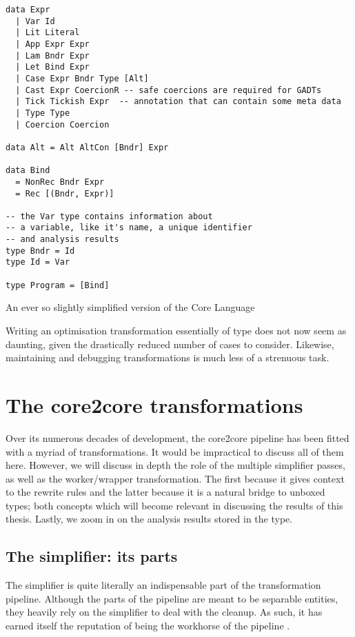 \begin{listing}[H]
\begin{verbatim}
data Expr
  | Var Id
  | Lit Literal
  | App Expr Expr
  | Lam Bndr Expr
  | Let Bind Expr
  | Case Expr Bndr Type [Alt]
  | Cast Expr CoercionR -- safe coercions are required for GADTs
  | Tick Tickish Expr  -- annotation that can contain some meta data
  | Type Type
  | Coercion Coercion
  
data Alt = Alt AltCon [Bndr] Expr
 
data Bind
  = NonRec Bndr Expr
  = Rec [(Bndr, Expr)]
  
-- the Var type contains information about
-- a variable, like it's name, a unique identifier
-- and analysis results
type Bndr = Id
type Id = Var

type Program = [Bind]
\end{verbatim}
\label{code:core_def}
\caption{An ever so slightly simplified version of the Core Language}
\end{listing}

Writing an optimisation transformation essentially of type  does not now seem
as daunting, given the drastically reduced number of cases to consider. 
Likewise, maintaining and debugging transformations is much less of a strenuous task.

\section{The core2core transformations}

Over its numerous decades of development, the core2core pipeline has been fitted with a myriad of transformations.
It would be impractical to discuss all of them here. However, we will discuss in depth the role of the multiple simplifier
passes, as well as the worker/wrapper transformation. The first because it gives context to the rewrite rules and the latter
because it is a natural bridge to unboxed types; both concepts which will become relevant in discussing the results of this thesis.
Lastly, we zoom in on the analysis results stored in the  type.

\subsection{The simplifier: its parts}

The simplifier is quite literally an indispensable part of the transformation pipeline. Although the parts of the pipeline
are meant to be separable entities, they heavily rely on the simplifier to deal with the cleanup. As such, it has earned
itself the reputation of being the workhorse of the pipeline \cite{ghc_wiki_core2core}.

